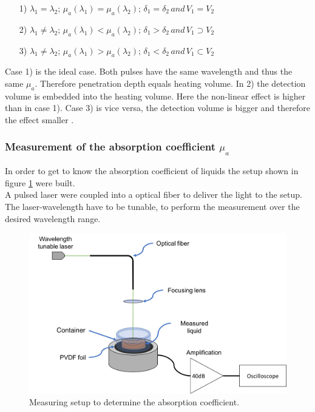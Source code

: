 \begin{itemize}
\centering
\item[1) ] $\lambda_1 = \lambda_2 ;\, \mu_a(\lambda_1) = \mu_a(\lambda_2) ;\, \delta_1 = \delta_2 \, and\, V_1 = V_2$
\item[2) ] $\lambda_1 \neq \lambda_2 ;\, \mu_a(\lambda_1) < \mu_a(\lambda_2) ;\, \delta_1 > \delta_2 \, and\, V_1 \supset V_2$
\item[3) ] $\lambda_1 \neq \lambda_2 ;\, \mu_a(\lambda_1) > \mu_a(\lambda_2) ;\, \delta_1 < \delta_2 \, and\, V_1 \subset V_2$
\end{itemize}

Case 1) is the ideal case. Both pulses have the same wavelength and thus the same $\mu_a$. Therefore penetration depth equals heating volume. In 2) the detection volume is embedded into the heating volume. Here the non-linear effect is higher than in case 1). Case 3) is vice versa, the detection volume is bigger and therefore the effect smaller \cite{Tian:dualPulse}.

\subsubsection{Measurement  of the absorption coefficient $\mu_a$}

In order to get to know the absorption coefficient of liquids the setup shown in figure \ref{fig:mu_aSetup} were built. \\
A pulsed laser were coupled into a optical fiber to deliver the light to the setup. The laser-wavelength have to be tunable, to perform the measurement over the desired wavelength range.  

\begin{figure}[H]
	\centering
	\includegraphics[width = \textwidth]{03_GR-PAM_theory/images/mu_aSetup.jpg}
	\caption{Measuring setup to determine the absorption coefficient.}
	\label{fig:mu_aSetup}
\end{figure}

